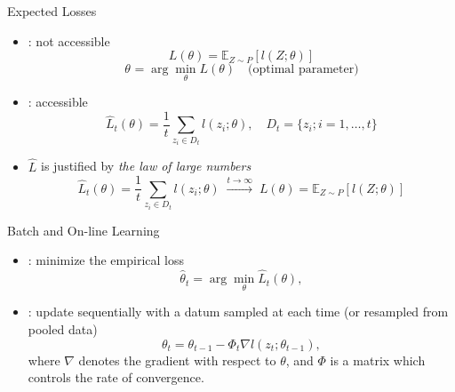 \documentclass[fleqn,aspectratio=1610]{beamer}
\begin{document}
\begin{frame}[label={sec:orgac04f4a}]{Expected Losses}
\begin{itemize}
\item {}: not accessible
\begin{equation}
  L(\theta)
  =\mathbb{E}_{Z\sim P}[l(Z;\theta)]
\end{equation}
\begin{equation}
  \theta_{}
  = \arg\min_\theta L(\theta)
  \quad\text{(optimal parameter)}
\end{equation}
\item {}: accessible
\begin{equation}
  \hat{L}_{t}(\theta)
  =\frac{1}{t}\sum_{z_{i}\in D_{t}}l(z_{i};\theta),
  \quad D_{t}=\{z_{i}; i=1,\dotsc,t\}
\end{equation}
\item \(\hat{L}\) is justified by \emph{the law of large numbers}
\begin{equation}
  \hat{L}_{t}(\theta)=\frac{1}{t}\sum_{z_{i}\in {D_{t}}}l(z_{i};\theta)
  \;\xrightarrow{t\to\infty}\;
  L(\theta)
  =\mathbb{E}_{Z\sim P}\left[l(Z;\theta)\right]
\end{equation}
\end{itemize}
\end{frame}

\begin{frame}[label={sec:org7cc4e6b}]{Batch and On-line Learning}
\begin{itemize}
\item {}: minimize the empirical loss
\begin{equation}
  \hat\theta_{t}
  = \arg\min_\theta \hat{L}_{t}(\theta),
\end{equation}
\item {}: update sequentially
with a datum sampled at each time
(or resampled from pooled data)
\begin{equation}
  \theta_{t}
  = \theta_{t-1} - \varPhi_{t}\nabla l(z_{t};\theta_{t-1}),
\end{equation}
where \(\nabla\) denotes the gradient with respect to \(\theta\),
and \(\varPhi\) is a matrix which controls the rate of convergence.
\end{itemize}
\end{frame}
\end{document}
